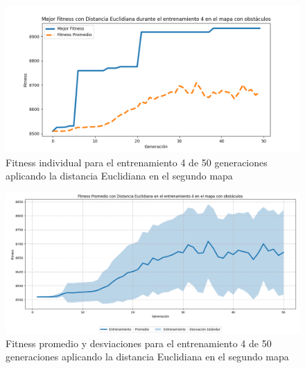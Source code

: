 \documentclass[lettersize, journal]{IEEEtran}
\begin{document}
\begin{figure}[H]
    \centering
    \includegraphics[width=0.9 \linewidth]{Euclidiana/Mapa2/Fitness_4_Map2_Eucli_50Gen.png}
    \caption{Fitness individual para el entrenamiento 4 de 50 generaciones aplicando la distancia Euclidiana en el segundo mapa}
    \label{fig:eucli_4_50_m2}
\end{figure}
\begin{figure}[H]
    \centering
    \includegraphics[width=0.9 \linewidth]{Euclidiana/Mapa2/Fitness_4_Map2_Eucli_50Gen_Sombra.png}
    \caption{Fitness promedio y desviaciones para el entrenamiento 4 de 50 generaciones aplicando la distancia Euclidiana en el segundo mapa}
    \label{fig:eucli_4_50_sombra_m2}
\end{figure}
\end{document}
